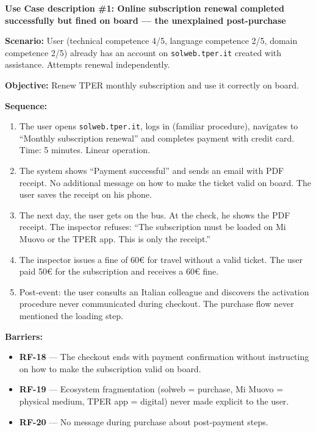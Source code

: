 ﻿\documentclass[11pt,a4paper]{article}
\begin{document}

\begin{tcolorbox}[sectionbox,colback=primaryColor!10]
    \textbf{Use Case description \#1: Online subscription renewal completed successfully but fined on board --- the unexplained post-purchase}
\end{tcolorbox}

\vspace{0.3cm}

\begin{tcolorbox}[base]
    {\small
    \textbf{Scenario:} User (technical competence 4/5, language competence 2/5, domain competence 2/5) already has an account on \texttt{solweb.tper.it} created with assistance. Attempts renewal independently.

    \textbf{Objective:} Renew TPER monthly subscription and use it correctly on board.

    \textbf{Sequence:}
    \begin{enumerate}
        \item The user opens \texttt{solweb.tper.it}, logs in (familiar procedure), navigates to ``Monthly subscription renewal'' and completes payment with credit card. Time: 5 minutes. Linear operation.
        \item The system shows ``Payment successful'' and sends an email with PDF receipt. No additional message on how to make the ticket valid on board. The user saves the receipt on his phone.
        \item The next day, the user gets on the bus. At the check, he shows the PDF receipt. The inspector refuses: ``The subscription must be loaded on Mi Muovo or the TPER app. This is only the receipt.''
        \item The inspector issues a fine of 60\euro{} for travel without a valid ticket. The user paid 50\euro{} for the subscription and receives a 60\euro{} fine.
        \item Post-event: the user consults an Italian colleague and discovers the activation procedure never communicated during checkout. The purchase flow never mentioned the loading step.
    \end{enumerate}

    \textbf{Barriers:}
    \begin{itemize}
        \item \textbf{RF-18} --- The checkout ends with payment confirmation without instructing on how to make the subscription valid on board.
        \item \textbf{RF-19} --- Ecosystem fragmentation (solweb = purchase, Mi Muovo = physical medium, TPER app = digital) never made explicit to the user.
        \item \textbf{RF-20} --- No message during purchase about post-payment steps.
    \end{itemize}

}
\end{tcolorbox}
\end{document}
